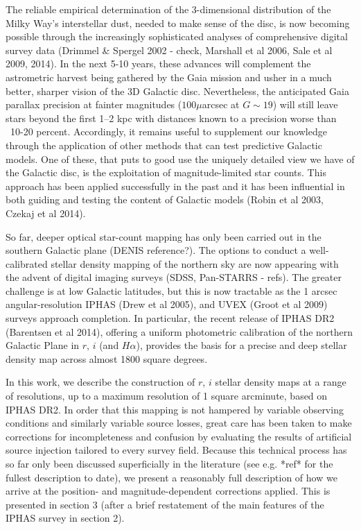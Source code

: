 \documentclass[a4paper,useAMS,usenatbib]{mn2e}
\begin{document}
The reliable empirical determination of the 3-dimensional distribution of the Milky 
Way's interstellar dust, needed to make sense of the disc, is now becoming possible 
through the increasingly sophisticated analyses of comprehensive digital survey data 
(Drimmel \& Spergel 2002 - check, Marshall et al 2006, Sale et al 2009, 2014).  In the
next 5-10 years, these advances will complement the astrometric harvest being gathered 
by the Gaia mission and usher in a much better, sharper vision of the 3D Galactic disc.
Nevertheless, the anticipated Gaia parallax precision at fainter magnitudes ($100\mu$arcsec 
at $G \sim 19$) will still leave stars beyond the first 1--2 kpc with distances known to 
a precision worse than ~10-20 percent.  Accordingly, it remains useful to supplement 
our knowledge through the application of other methods that can test predictive Galactic 
models.  One of these, that puts to good use the uniquely detailed view we have of the 
Galactic disc, is the exploitation of magnitude-limited star counts.  This approach has 
been applied successfully in the past and it has been influential in both guiding and 
testing the content of Galactic models (Robin et al 2003, Czekaj et al 2014).  

So far, deeper optical star-count mapping has only been carried out in the 
southern Galactic plane (DENIS reference?).  The options to conduct a 
well-calibrated stellar density mapping of the northern sky are now 
appearing with the advent of digital imaging surveys (SDSS, Pan-STARRS - 
refs).  The greater challenge is at low Galactic latitudes, but this is now 
tractable as the 1 arcsec angular-resolution IPHAS (Drew et al 2005), and 
UVEX (Groot et al 2009) surveys approach completion.  In particular, the 
recent release of IPHAS DR2 (Barentsen et al 2014), offering a uniform 
photometric calibration of the northern Galactic Plane in $r$, $i$ (and 
$H\alpha$), provides the basis for a precise and deep stellar density map 
across almost 1800 square degrees.

In this work, we describe the construction of $r$, $i$ stellar density maps at
a range of resolutions, up to a maximum resolution of 1 square arcminute, 
based on IPHAS DR2.  In order that this mapping is not hampered by variable 
observing conditions and similarly variable source losses, great care has been 
taken to make corrections for incompleteness and confusion by evaluating the 
results of artificial source injection tailored to every survey field. Because 
this technical process has so far only been discussed superficially in the 
literature (see e.g. *ref* for the fullest description to date), we present a 
reasonably full description of how we arrive at the position- and 
magnitude-dependent corrections applied.  This is presented in section 3 (after
a brief restatement of the main features of the IPHAS survey in section 2).
\end{document}
